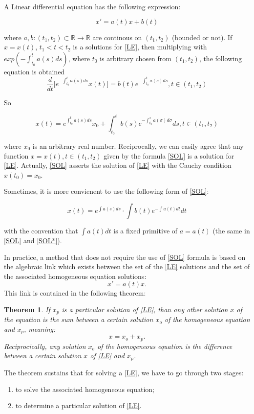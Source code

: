 \documentclass[a4paper,11pt]{report}
\newtheorem{theorem}{Theorem}[subsection]
\newcommand{\R}{\mathbb{R}}
\begin{document}
A Linear differential equation has the following expression:

\begin{equation}
 x'=a(t)x+b(t) \label{LE} \tag{LE}
\end{equation}

where $a,b: (t_1,t_2) \subset \R\rightarrow\R$ are continous on $(t_1,t_2)$ (bounded or not). If $x=x(t)$, $t_1<t<t_2$ is a solutions for \eqref{LE}, then
multiplying with $exp(-\int_{t_0}^{t} a(s)ds)$, where $t_0$ is arbitrary chosen from $(t_1,t_2)$, the following equation is obtained
\begin{equation*}
 \frac{d}{dt}\bigg[ e^{-\int_{t_0}^{t} a(s)ds}x(t)\bigg] = b(t)e^{-\int_{t_0}^{t} a(s)ds}, t \in (t_1,t_2) 
\end{equation*}

So

\begin{equation}
 x(t)=e^{\int_{t_0}^{t} a(s)ds}x_0 + \int_{t_0}^{t} b(s)e^{-\int_{t_0}^{s} a(\sigma)d\sigma}ds , t \in (t_1,t_2) \label{SOL} \tag{SOL}
\end{equation}

where $x_0$ is an arbitrary real number. Reciprocally, we can easily agree that any function $x=x(t), t\in (t_1,t_2)$ given by the formula \eqref{SOL} is a solution for \eqref{LE}.
Actually, \eqref{SOL} asserts the solution of \eqref{LE} with the Cauchy condition $x(t_0)=x_0$.

Sometimes, it is more convienent to use the following form of \eqref{SOL}:

\begin{equation}
 x(t)= e^{\int a(s)ds}\cdot\int b(t)e^{-\int a(t) dt}dt \label{SOL*}\tag{SOL*}
\end{equation}

with the convention that $\int a(t) dt$ is a fixed primitive of $a=a(t)$ (the same in \eqref{SOL} and \eqref{SOL*}).

In practice, a method that does not require the use of \eqref{SOL} formula is based on the algebraic link which exists between the set of the \eqref{LE} solutions and the set of the associated homogeneous equation solutions: $$x'=a(t)x.$$
This link is contained in the following theorem:
\begin{theorem}\label{1.2.1.1}
 If $x_{p}$ is a particular solution of \eqref{LE}, than any other solution $x$ of the equation is the sum between a certain solution $x_{o}$ of the homogeneous equation and $x_{p}$, meaning: $$x=x_{o}+x_{p}.$$ Reciprocically, any solution $x_{o}$ of the homogeneous equation is the difference between a certain solution $x$ of \eqref{LE} and $x_{p}$.
\end{theorem}
The theorem sustains that for solving a \eqref{LE}, we have to go through two stages:
\begin{enumerate}
 \item to solve the associated homogeneous equation;
 \item to determine a particular solution of \eqref{LE}.
\end{enumerate}
\end{document}
